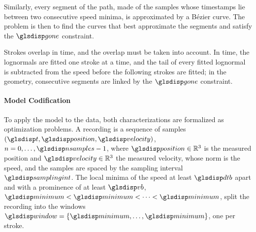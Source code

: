 \documentclass[12pt]{report}
\begin{document}
Similarly, every segment of the path, made of the samples whose timestamps lie between two consecutive speed minima, is approximated by a Bézier curve. The problem is then to find the curves that best approximate the segments and satisfy the $\sym{gone}$ constraint.

Strokes overlap in time, and the overlap must be taken into account. In time, the lognormals are fitted one stroke at a time, and the tail of every fitted lognormal is subtracted from the speed before the following strokes are fitted; in the geometry, consecutive segments are linked by the $\sym{gone}$ constraint.

\paragraph{Model Codification}
To apply the model to the data, both characterizations are formalized as optimization problems. A recording is a sequence of samples $(\sym{t}_n,\sym{position}_n,\sym{velocity}_n)$, $n=0,\dots,\sym{nsamples}-1$, where $\sym{position}_n\in\mathbb{R}^3$ is the measured position and $\sym{velocity}_n\in\mathbb R^3$ the measured velocity, whose norm is the speed, and the samples are spaced by the sampling interval $\sym{samplingint}$. The local minima of the speed at least $\sym{dtb}$ apart and with a prominence of at least $\sym{vb}$, $\sym{minimum}_0<\sym{minimum}_1<\dots<\sym{minimum}_{\sym*{nwindows}}$, split the recording into the windows $\sym{window}_k=\{\sym{minimum}_k,\dots,\sym{minimum}_{k+1}\}$, one per stroke.
\end{document}
